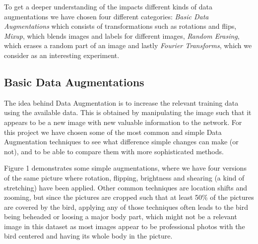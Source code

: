 \documentclass{article}
\begin{document}
To get a deeper understanding of the impacts different kinds of data augmentations 
we have chosen four different categories: \textit{Basic Data Augmentations} which consists of transformations such as rotations and flips, 
 \textit{Mixup}, which blends images and labels for different images, \textit{Random Erasing}, which erases a random part of an image and lastly 
\textit{Fourier Transforms}, which we consider as an interesting experiment.

\subsection{Basic Data Augmentations}
The idea behind Data Augmentation is to increase the relevant training data using the available data. This is obtained by manipulating the image such that it appears to be a new image with new valuable information to the network. For this project we have chosen some of the most common and simple Data Augmentation techniques to see what difference simple changes can make (or not), and to be able to compare them with more sophisticated methods. 

Figure 1 demonstrates some simple augmentations, where we have four versions of the same picture where rotation, flipping, brightness and shearing (a kind of stretching) have been applied. Other common techniques are location shifts and zooming, but since the pictures are cropped such that at least 50\% of the pictures are covered by the bird, applying any of those techniques often leads to the bird being beheaded or loosing a major body part, which might not be a relevant image in this dataset as most images appear to be professional photos with the bird centered and having its whole body in the picture.
\end{document}
